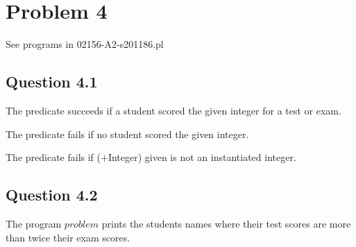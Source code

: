 \newpage
\section*{Problem 4}
See programs in 02156-A2-s201186.pl

\subsection*{Question 4.1}
The predicate succeeds if a student scored the given integer for a test or exam.

The predicate fails if no student scored the given integer.

The predicate fails if (+Integer) given is not an instantiated integer. 


\subsection*{Question 4.2}
The program $problem$ prints the students names where their test scores are more than twice their exam scores.
